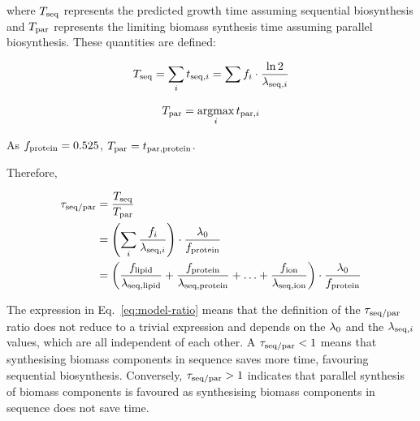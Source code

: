 where $T_{\mathrm{seq}}$ represents the predicted growth time assuming sequential biosynthesis and $T_{\mathrm{par}}$ represents the limiting biomass synthesis time assuming parallel biosynthesis.
These quantities are defined:

\begin{equation}
  T_{\mathrm{seq}} = \sum_{i} t_{\mathrm{seq},i} = \sum f_{i} \cdot \frac{\ln 2}{\lambda_{\mathrm{seq},i}}
  \label{eq:model-a}
\end{equation}


\begin{equation}
  T_{\mathrm{par}} = \operatorname*{argmax}_{i} t_{\mathrm{par},i}
  \label{eq:model-b}
\end{equation}

As $f_{\mathrm{protein}} = 0.525$, $T_{\mathrm{par}} = t_{\mathrm{par},\mathrm{protein}}$.

Therefore,

\begin{equation}
  \begin{aligned}
    \tau_{\mathrm{seq}/\mathrm{par}} &= \frac{T_{\mathrm{seq}}}{T_{\mathrm{par}}} \\
    & = \left( \sum_i \frac{f_i}{\lambda_{\mathrm{seq},i}} \right) \cdot \frac{\lambda_{0}}{f_{\mathrm{protein}}} \\
    & = \left( \frac{f_{\mathrm{lipid}}}{\lambda_{\mathrm{seq},\mathrm{lipid}}} + \frac{f_{\mathrm{protein}}}{\lambda_{\mathrm{seq},\mathrm{protein}}} + \ldots + \frac{f_{\mathrm{ion}}}{\lambda_{\mathrm{seq},\mathrm{ion}}} \right) \cdot \frac{\lambda_{0}}{f_{\mathrm{protein}}}
    \end{aligned}
  \label{eq:model-ratio}
\end{equation}

The expression in Eq.\ \ref{eq:model-ratio} means that the definition of the $\tau_{\mathrm{seq}/\mathrm{par}}$ ratio does not reduce to a trivial expression and depends on the $\lambda_{0}$ and the $\lambda_{\mathrm{seq},i}$ values, which are all independent of each other.
A $\tau_{\mathrm{seq}/\mathrm{par}} < 1$ means that synthesising biomass components in sequence saves more time, favouring sequential biosynthesis.
Conversely, $\tau_{\mathrm{seq}/\mathrm{par}} > 1$ indicates that parallel synthesis of biomass components is favoured as synthesising biomass components in sequence does not save time.


